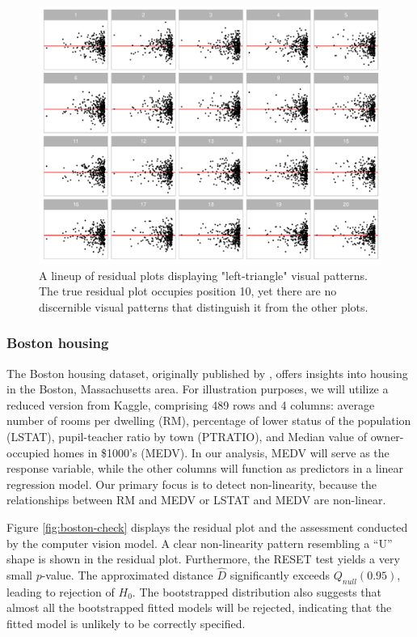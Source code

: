 \documentclass[]{interact}
\theoremstyle{plain}%
\theoremstyle{definition}
\theoremstyle{remark}
\begin{document}
\begin{figure}[!h]

{\centering \includegraphics[width=1\linewidth]{paper_files/figure-latex/false-lineup-1} 

}

\caption{A lineup of residual plots displaying "left-triangle" visual patterns. The true residual plot occupies position 10, yet there are no discernible visual patterns that distinguish it from the other plots.}\label{fig:false-lineup}
\end{figure}

\subsubsection{Boston housing}\label{boston-housing}

The Boston housing dataset, originally published by
\citet{harrison1978hedonic}, offers insights into housing in the Boston,
Massachusetts area. For illustration purposes, we will utilize a reduced
version from Kaggle, comprising 489 rows and 4 columns: average number
of rooms per dwelling (RM), percentage of lower status of the population
(LSTAT), pupil-teacher ratio by town (PTRATIO), and Median value of
owner-occupied homes in \$1000's (MEDV). In our analysis, MEDV will
serve as the response variable, while the other columns will function as
predictors in a linear regression model. Our primary focus is to detect
non-linearity, because the relationships between RM and MEDV or LSTAT
and MEDV are non-linear.

Figure \ref{fig:boston-check} displays the residual plot and the
assessment conducted by the computer vision model. A clear non-linearity
pattern resembling a ``U'' shape is shown in the residual plot.
Furthermore, the RESET test yields a very small \(p\)-value. The
approximated distance \(\hat{D}\) significantly exceeds
\(Q_{null}(0.95)\), leading to rejection of \(H_0\). The bootstrapped
distribution also suggests that almost all the bootstrapped fitted
models will be rejected, indicating that the fitted model is unlikely to
be correctly specified.
\end{document}
